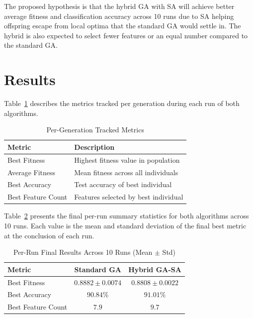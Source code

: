 \documentclass[letterpaper]{article} %
\begin{document}
The proposed hypothesis is that the hybrid GA with SA will achieve better average fitness and classification accuracy across 10 runs due to SA helping offspring escape from local optima that the standard GA would settle in. The hybrid is also expected to select fewer features or an equal number compared to the standard GA.

\section{Results}

Table~\ref{tab:pergen} describes the metrics tracked per generation during each run of both algorithms.

\begin{table}[H]
\centering
\caption{Per-Generation Tracked Metrics}
\label{tab:pergen}
\begin{tabular}{ll}
\toprule
\textbf{Metric} & \textbf{Description} \\
\midrule
Best Fitness       & Highest fitness value in population \\
Average Fitness    & Mean fitness across all individuals \\
Best Accuracy      & Test accuracy of best individual \\
Best Feature Count & Features selected by best individual \\
\bottomrule
\end{tabular}
\end{table}

Table~\ref{tab:perrun} presents the final per-run summary statistics for both algorithms across 10 runs. Each value is the mean and standard deviation of the final best metric at the conclusion of each run.

\begin{table}[H]
\centering
\caption{Per-Run Final Results Across 10 Runs (Mean $\pm$ Std)}
\label{tab:perrun}
\begin{tabular}{lcc}
\toprule
\textbf{Metric} & \textbf{Standard GA} & \textbf{Hybrid GA-SA} \\
\midrule
Best Fitness     & $0.8882 \pm 0.0074$ & $0.8808 \pm 0.0022$ \\
Best Accuracy    & $90.84\%$ & $91.01\%$ \\
Best Feature Count & $7.9$ & $9.7$ \\
\bottomrule
\end{tabular}
\end{table}

\end{document}
